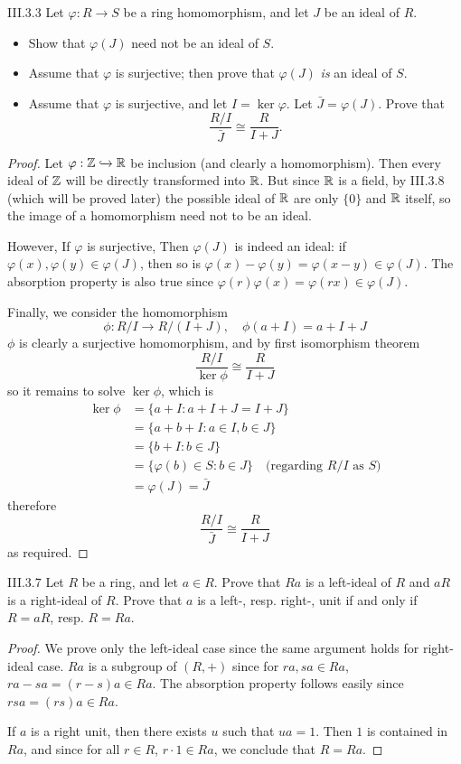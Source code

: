 \begin{problem}{III.3.3}
Let $\varphi : R \to S$ be a ring homomorphism, and let $J$ be an ideal of $R$.
\end{problem}
\begin{itemize}
\setlength\itemsep{0pt}
\item Show that $\varphi(J)$ need not be an ideal of $S$.
\item Assume that $\varphi$ is surjective; then prove that $\varphi(J)$ \emph{is} an ideal of $S$.
\item Assume that $\varphi$ is surjective, and let $I = \ker \varphi$. Let $\bar{J} = \varphi(J)$. Prove that 
\[
\frac{R/I}{\bar{J}} \cong \frac{R}{I+J}.	
\]
\end{itemize}
\begin{proof}
Let $\varphi : \mathbb{Z} \xhookrightarrow{} \mathbb{R}$ be inclusion (and clearly a homomorphism). Then every ideal of $\mathbb{Z}$ will be directly transformed into $\mathbb{R}$. But since $\mathbb{R}$ is a field, by III.3.8 (which will be proved later) the possible ideal of $\mathbb{R}$ are only $\{0\}$ and $\mathbb{R}$ itself, so the image of a homomorphism need not to be an ideal.

However, If $\varphi$ is surjective, Then $\varphi(J)$ is indeed an ideal: if $\varphi(x), \varphi(y) \in \varphi(J)$, then so is $\varphi(x) - \varphi(y) = \varphi(x-y) \in \varphi(J)$. The absorption property is also true since $\varphi(r)\varphi(x) = \varphi(rx) \in \varphi(J)$.

Finally, we consider the homomorphism
\[
\phi : R/I \to R/(I+J), \quad \phi(a + I) = a + I + J
\]
$\phi$ is clearly a surjective homomorphism, and by first isomorphism theorem
\[
\frac{R/I}{\ker \phi} \cong \frac{R}{I+J}	
\]
so it remains to solve $\ker \phi$, which is
\begin{align*}
\ker \phi &= \{a + I : a + I + J = I + J\} \\
&= \{a +b + I : a \in I, b \in J\} \\
&= \{b + I : b \in J\} \\
&= \{\varphi(b) \in S : b \in J\} \quad \text{(regarding } R/I \text{ as } S)\\
&= \varphi(J) = \bar{J}
\end{align*}
therefore
\[
\frac{R/I}{\bar{J}} \cong \frac{R}{I+J}
\]
as required.
\end{proof}

\begin{problem}{III.3.7}
Let $R$ be a ring, and let $a \in R$. Prove that $Ra$ is a left-ideal of $R$ and $aR$ is a right-ideal of $R$. Prove that $a$ is a left-, resp. right-, unit if and only if $R = aR$, resp. $R = Ra$.
\end{problem}
\begin{proof}
We prove only the left-ideal case since the same argument holds for right-ideal case. $Ra$ is a subgroup of $(R,+)$ since for $ra, sa \in Ra$, $ra - sa = (r-s)a \in Ra$. The absorption property follows easily since $rsa = (rs)a \in Ra$.

If $a$ is a right unit, then there exists $u$ such that $ua = 1$. Then $1$ is contained in $Ra$, and since for all $r\in R$, $r \cdot 1 \in Ra$, we conclude that $R = Ra$.   
\end{proof}

